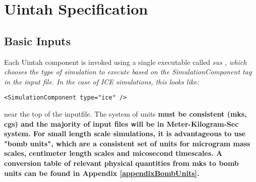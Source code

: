 
\section{Uintah Specification}
\subsection{Basic Inputs}
Each Uintah component is invoked using a single executable called
\it sus \normalfont, which chooses the type of simulation
to execute based on the \it SimulationComponent \normalfont tag in the
input file.  In the case of ICE simulations, this looks like:
%
\begin{Verbatim}[fontsize=\footnotesize]
 <SimulationComponent type="ice" />
\end{Verbatim}
%
near the top of the inputfile.  The system of units \bf{must }\normalfont be
consistent (mks, cgs) and the majority of input files will be in Meter-Kilogram-Sec
system.  For small length scale simulations, it is advantageous to use "bomb units", 
which are a consistent set of units for microgram mass scales, centimeter length scales
and micosecond timescales.  A conversion table of relevant physical quantities from mks
to bomb units can be found in Appendix \ref{appendixBombUnits}.


%
